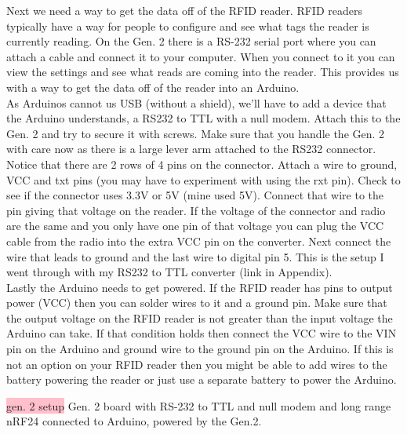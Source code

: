 \documentclass[12pt]{article}
\begin{document}
Next we need a way to get the data off of the RFID reader.  RFID readers typically have a way for people to configure and see what tags the reader is currently reading.  On the Gen. 2 there is a RS-232 serial port where you can attach a cable and connect it to your computer.  When you connect to it you can view the settings and see what reads are coming into the reader.  This provides us with a way to get the data off of the reader into an Arduino.\\
As Arduinos cannot us USB (without a shield), we'll have to add a device that the Arduino understands, a RS232 to TTL with a null modem.  Attach this to the Gen. 2 and try to secure it with screws.  Make sure that you handle the Gen. 2 with care now as there is a large lever arm attached to the RS232 connector.  Notice that there are 2 rows of 4 pins on the connector.  Attach a wire to ground, VCC and txt pins (you may have to experiment with using the rxt pin).  Check to see if the connector uses 3.3V or 5V (mine used 5V).  Connect that wire to the pin giving that voltage on the reader.  If the voltage of the connector and radio are the same and you only have one pin of that voltage you can plug the VCC cable from the radio into the extra VCC pin on the converter.  Next connect the wire that leads to ground and the last wire to digital pin 5.  This is the setup I went through with my RS232 to TTL converter (link in Appendix).\\
Lastly the Arduino needs to get powered.  If the RFID reader has pins to output power (VCC) then you can solder wires to it and a ground pin.  Make sure that the output voltage on the RFID reader is not greater than the input voltage the Arduino can take.  If that condition holds then connect the VCC wire to the VIN pin on the Arduino and ground wire to the ground pin on the Arduino.  If this is not an option on your RFID reader then you might be able to add wires to the battery powering the reader or just use a separate battery to power the Arduino.\\
\begin{center}
	\colorbox{pink}{gen. 2 setup}
	Gen. 2 board with RS-232 to TTL and null modem and long range nRF24 connected to Arduino, powered by the Gen.2.
\end{center}
\end{document}
